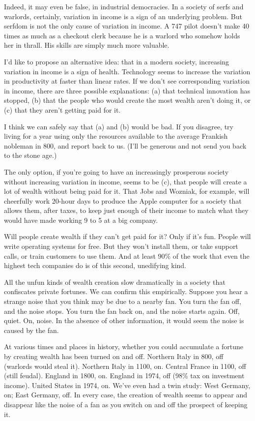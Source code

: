 Indeed, it may even be false, in industrial democracies. In a society of
serfs and warlords, certainly, variation in income is a sign of an
underlying problem. But serfdom is not the only cause of variation in
income. A 747 pilot doesn't make 40 times as much as a checkout clerk
because he is a warlord who somehow holds her in thrall. His skills are
simply much more valuable.

I'd like to propose an alternative idea: that in a modern society,
increasing variation in income is a sign of health. Technology seems to
increase the variation in productivity at faster than linear rates. If
we don't see corresponding variation in income, there are three possible
explanations: (a) that technical innovation has stopped, (b) that the
people who would create the most wealth aren't doing it, or (c) that
they aren't getting paid for it.

I think we can safely say that (a) and (b) would be bad. If you
disagree, try living for a year using only the resources available to
the average Frankish nobleman in 800, and report back to us. (I'll be
generous and not send you back to the stone age.)

The only option, if you're going to have an increasingly prosperous
society without increasing variation in income, seems to be (c), that
people will create a lot of wealth without being paid for it. That Jobs
and Wozniak, for example, will cheerfully work 20-hour days to produce
the Apple computer for a society that allows them, after taxes, to keep
just enough of their income to match what they would have made working 9
to 5 at a big company.

Will people create wealth if they can't get paid for it? Only if it's
fun. People will write operating systems for free. But they won't
install them, or take support calls, or train customers to use them. And
at least 90\% of the work that even the highest tech companies do is of
this second, unedifying kind.

All the unfun kinds of wealth creation slow dramatically in a society
that confiscates private fortunes. We can confirm this empirically.
Suppose you hear a strange noise that you think may be due to a nearby
fan. You turn the fan off, and the noise stops. You turn the fan back
on, and the noise starts again. Off, quiet. On, noise. In the absence of
other information, it would seem the noise is caused by the fan.

At various times and places in history, whether you could accumulate a
fortune by creating wealth has been turned on and off. Northern Italy in
800, off (warlords would steal it). Northern Italy in 1100, on. Central
France in 1100, off (still feudal). England in 1800, on. England in
1974, off (98\% tax on investment income). United States in 1974, on.
We've even had a twin study: West Germany, on; East Germany, off. In
every case, the creation of wealth seems to appear and disappear like
the noise of a fan as you switch on and off the prospect of keeping it.

